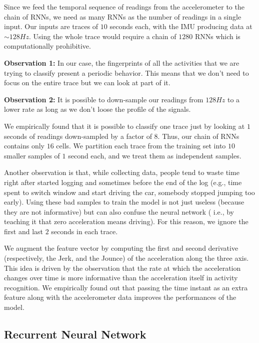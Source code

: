 \documentclass{article}
\begin{document}
Since we feed the temporal sequence of readings from the accelerometer to the chain of RNNs,
we need as many RNNs as the number of readings in a single input. Our inputs are traces of
$10$ seconds each, with the IMU producing data at $\sim 128Hz$. Using the whole trace would
require a chain of $1280$ RNNs which is computationally prohibitive.

\textbf{Observation 1:} In our
case, the fingerprints of all the activities that we are trying to classify present a periodic behavior.
This means that we don't need to focus on the entire trace but we can look at part of it.

\textbf{Observation 2:} It is possible to down-sample our readings from $128Hz$ to a lower
rate as long as we don't loose the profile of the signals.

We empirically found that it is possible to classify one trace just by looking at $1$ seconds of
readings down-sampled by a factor of $8$. Thus, our chain of RNNs contains only $16$ cells.
We partition each trace from the training set into $10$ smaller samples of $1$ second each,
and we treat them as independent samples.

Another observation is that, while collecting data, people tend to waste time right after started
logging and sometimes before the end of the log (e.g., time spent to switch window and start
driving the car, somebody stopped jumping too early). Using these bad samples to train the model
is not just useless (because they are not informative) but can also confuse the neural network (
i.e., by teaching it that zero acceleration means driving). For this reason, we ignore the first and
last $2$ seconds in each trace.

We augment the feature vector by computing the first and second derivative (respectively,
the Jerk, and the Jounce) of the acceleration along the three axis. This idea is driven by the
observation that the rate at which the acceleration changes over time is more informative
than the acceleration itself in activity recognition. We empirically found out that passing
the time instant as an extra feature along with the accelerometer data improves the performances
of the model.


\subsection{Recurrent Neural Network}
\vspace{-.2cm}
\end{document}
